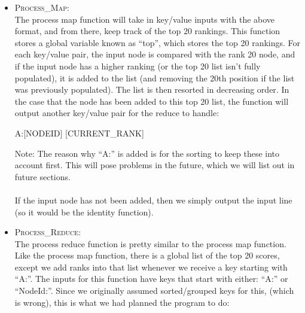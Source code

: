 \begin{itemize}
        After retrieving the adjacency matrix and setting the current rank to be the aggregated rankings for a particular NodeId, the PageRank reduce function will output a key/value pair in the following format:
        \begin{center}
          NodeId:[NODEID] \hspace{4mm} [ITERATION],[CURRENT\_RANK],[PREVIOUS\_RANK],[ADJACENCY\_LIST]
        \end{center}
        This output will then be passed into the \textsc{Process\_Map} function.
        \vspace{5mm}
        \item \textsc{Process\_Map}: \\
        The process map function will take in key/value inputs with the above format, and from there, keep track of the top 20 rankings. This function stores a global variable known as ``top'', which stores the top 20 rankings. For each key/value pair, the input node is compared with the rank 20 node, and if the input node has a higher ranking (or the top 20 list isn't fully populated), it is added to the list (and removing the 20th position if the list was previously populated). The list is then resorted in decreasing order. In the case that the node has been added to this top 20 list, the function will output another key/value pair for the reduce to handle:
        \begin{center}
        A:[NODEID] \hspace{8mm} [CURRENT\_RANK]
        \end{center}
        Note: The reason why ``A:'' is added is for the sorting to keep these into account first. This will pose problems in the future, which we will list out in future sections. 
        \\ \\
        \noindent If the input node has not been added, then we simply output the input line (so it would be the identity function).
        \vspace{5mm}
        \item \textsc{Process\_Reduce}: \\
        The process reduce function is pretty similar to the process map function. Like the process map function, there is a global list of the top 20 scores, except we add ranks into that list whenever we receive a key starting with ``A:''. The inputs for this function have keys that start with either: ``A:'' or ``NodeId:''. Since we originally assumed sorted/grouped keys for this, (which is wrong), this is what we had planned the program to do:

\end{itemize}
